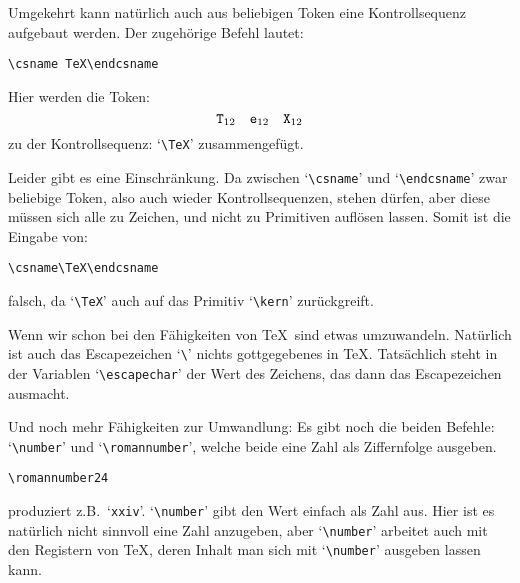 Umgekehrt kann nat\"urlich auch aus beliebigen Token eine
Kontrollsequenz aufgebaut werden. Der zugeh\"orige Befehl lautet:
\begin{verbatim}
\csname TeX\endcsname
\end{verbatim}
Hier werden die Token:
\[ \mbox{\tt T}_{12}\quad \mbox{\tt e}_{12}\quad \mbox{\tt X}_{12}\]
zu der Kontrollsequenz: `\verb|\TeX|' zusammengef\"ugt.

Leider gibt es eine Einschr\"ankung. Da zwischen
`\verb|\csname|' und `\verb|\endcsname|' zwar beliebige Token, also
auch wieder Kontrollsequenzen, stehen d\"urfen, aber diese m\"ussen sich
alle zu Zeichen, und nicht zu 
Primitiven aufl\"osen lassen. Somit ist
die Eingabe von:
\begin{verbatim}
\csname\TeX\endcsname
\end{verbatim}
falsch, da `\verb|\TeX|' auch auf das 
Primitiv `\verb|\kern|'
zur\"uckgreift.

Wenn wir schon bei den F\"ahigkeiten von \TeX\ sind etwas umzuwandeln.
Nat\"urlich ist auch das 
Escapezeichen `\verb|\|' nichts gottgegebenes
in \TeX. Tats\"achlich steht in der Variablen
`\verb|\escapechar|' der
Wert des Zeichens, das dann das Escapezeichen ausmacht.

Und noch mehr F\"ahigkeiten zur Umwandlung:
Es gibt noch die beiden Befehle: 
`\verb|\number|' und
`\verb|\romannumber|', welche beide eine Zahl als Ziffernfolge
ausgeben.
\begin{verbatim}
\romannumber24
\end{verbatim}
produziert z.B.\ `\verb|xxiv|'. `\verb|\number|' gibt den Wert einfach
als Zahl aus. Hier ist es nat\"urlich nicht sinnvoll eine Zahl
anzugeben, aber `\verb|\number|' arbeitet auch mit den
Registern von
\TeX, deren Inhalt man sich mit `\verb|\number|' ausgeben lassen kann.
